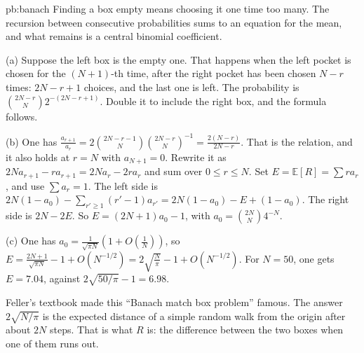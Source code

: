 \begin{solution}{pb:banach}
\idea Finding a box empty means choosing it one time too many. The recursion between consecutive probabilities sums to an equation for the mean, and what remains is a central
binomial coefficient.

\writeup (a) Suppose the left box is the empty one. That happens when the left pocket is chosen for the $(N+1)$-th time, after the right pocket has been chosen $N-r$ times: $2N-r+1$
choices, and the last one is left. The probability is $\binom{2N-r}N2^{-(2N-r+1)}$. Double it to include the right box, and the formula follows.

(b) One has $\frac{a_{r+1}}{a_r}=2\binom{2N-r-1}N\binom{2N-r}N^{-1}=\frac{2(N-r)}{2N-r}$. That is the relation, and it also holds at $r=N$ with $a_{N+1}=0$. Rewrite it as $2Na_{r+1}-ra_{r+1}=2Na_r-2ra_r$ and sum over
$0\le r\le N$. Set $E=\mathbb E[R]=\sum ra_r$, and use $\sum a_r=1$. The left side is $2N(1-a_0)-\sum_{r'\ge1}(r'-1)a_{r'}=2N(1-a_0)-E+(1-a_0)$. The right side is $2N-2E$. So $E=(2N+1)a_0-1$, with
$a_0=\binom{2N}N4^{-N}$.

(c) One has $a_0=\frac1{\sqrt{\pi N}}(1+O(\frac1N))$, so $E=\frac{2N+1}{\sqrt{\pi N}}-1+O(N^{-1/2})=2\sqrt{\frac N\pi}-1+O(N^{-1/2})$. For $N=50$, one gets $E=7.04$, against $2\sqrt{50/\pi}-1=6.98$.

\leads Feller's textbook made this ``Banach match box problem'' famous. The answer $2\sqrt{N/\pi}$ is the expected distance of a simple random walk from the origin after about $2N$ steps.
That is what $R$ is: the difference between the two boxes when one of them runs out.
\end{solution}

